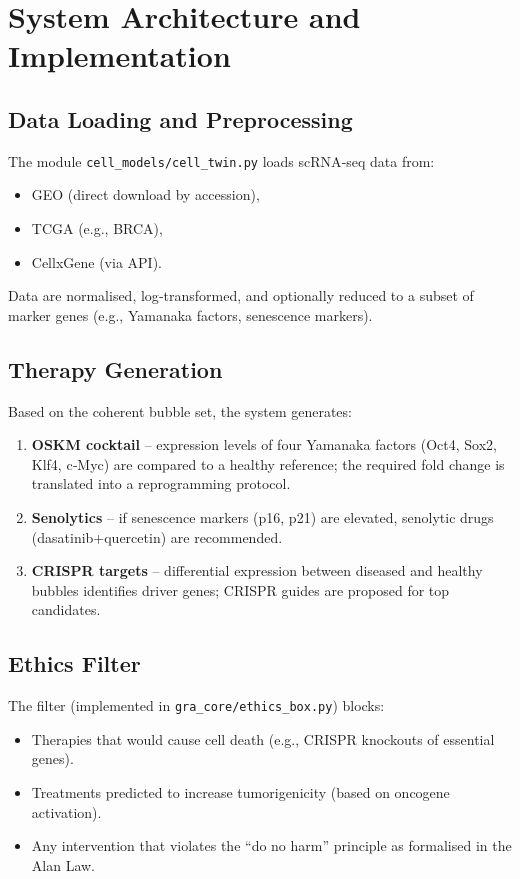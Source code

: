 \documentclass[12pt,a4paper]{article}
\begin{document}
\section{System Architecture and Implementation}

\subsection{Data Loading and Preprocessing}
The module \texttt{cell\_models/cell\_twin.py} loads scRNA‑seq data from:
\begin{itemize}
    \item GEO (direct download by accession),
    \item TCGA (e.g., BRCA),
    \item CellxGene (via API).
\end{itemize}
Data are normalised, log‑transformed, and optionally reduced to a subset of marker genes (e.g., Yamanaka factors, senescence markers).

\subsection{Therapy Generation}
Based on the coherent bubble set, the system generates:
\begin{enumerate}
    \item \textbf{OSKM cocktail} – expression levels of four Yamanaka factors (Oct4, Sox2, Klf4, c‑Myc) are compared to a healthy reference; the required fold change is translated into a reprogramming protocol.
    \item \textbf{Senolytics} – if senescence markers (p16, p21) are elevated, senolytic drugs (dasatinib+quercetin) are recommended.
    \item \textbf{CRISPR targets} – differential expression between diseased and healthy bubbles identifies driver genes; CRISPR guides are proposed for top candidates.
\end{enumerate}

\subsection{Ethics Filter}
The filter (implemented in \texttt{gra\_core/ethics\_box.py}) blocks:
\begin{itemize}
    \item Therapies that would cause cell death (e.g., CRISPR knockouts of essential genes).
    \item Treatments predicted to increase tumorigenicity (based on oncogene activation).
    \item Any intervention that violates the “do no harm” principle as formalised in the Alan Law.
\end{itemize}
\end{document}
